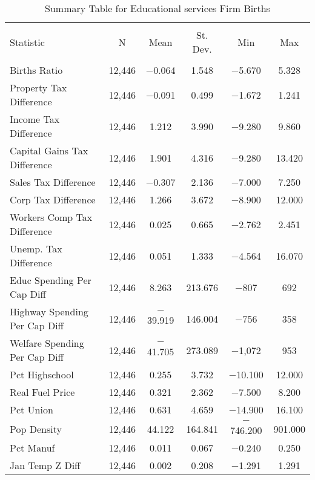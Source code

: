 
\begin{table}[!htbp] \centering 
  \caption{Summary Table for  Educational services Firm Births} 
  \label{61summary} 
\begin{tabular}{@{\extracolsep{5pt}}lccccc} 
\\[-1.8ex]\hline 
\hline \\[-1.8ex] 
Statistic & \multicolumn{1}{c}{N} & \multicolumn{1}{c}{Mean} & \multicolumn{1}{c}{St. Dev.} & \multicolumn{1}{c}{Min} & \multicolumn{1}{c}{Max} \\ 
\hline \\[-1.8ex] 
Births Ratio & 12,446 & $-$0.064 & 1.548 & $-$5.670 & 5.328 \\ 
Property Tax Difference & 12,446 & $-$0.091 & 0.499 & $-$1.672 & 1.241 \\ 
Income Tax Difference & 12,446 & 1.212 & 3.990 & $-$9.280 & 9.860 \\ 
Capital Gains Tax Difference & 12,446 & 1.901 & 4.316 & $-$9.280 & 13.420 \\ 
Sales Tax Difference & 12,446 & $-$0.307 & 2.136 & $-$7.000 & 7.250 \\ 
Corp Tax Difference & 12,446 & 1.266 & 3.672 & $-$8.900 & 12.000 \\ 
Workers Comp Tax Difference & 12,446 & 0.025 & 0.665 & $-$2.762 & 2.451 \\ 
Unemp. Tax Difference & 12,446 & 0.051 & 1.333 & $-$4.564 & 16.070 \\ 
Educ Spending Per Cap Diff & 12,446 & 8.263 & 213.676 & $-$807 & 692 \\ 
Highway Spending Per Cap Diff & 12,446 & $-$39.919 & 146.004 & $-$756 & 358 \\ 
Welfare Spending Per Cap Diff & 12,446 & $-$41.705 & 273.089 & $-$1,072 & 953 \\ 
Pct Highschool & 12,446 & 0.255 & 3.732 & $-$10.100 & 12.000 \\ 
Real Fuel Price & 12,446 & 0.321 & 2.362 & $-$7.500 & 8.200 \\ 
Pct Union & 12,446 & 0.631 & 4.659 & $-$14.900 & 16.100 \\ 
Pop Density & 12,446 & 44.122 & 164.841 & $-$746.200 & 901.000 \\ 
Pct Manuf & 12,446 & 0.011 & 0.067 & $-$0.240 & 0.250 \\ 
Jan Temp Z Diff & 12,446 & 0.002 & 0.208 & $-$1.291 & 1.291 \\ 

\end{tabular}
\end{table}
